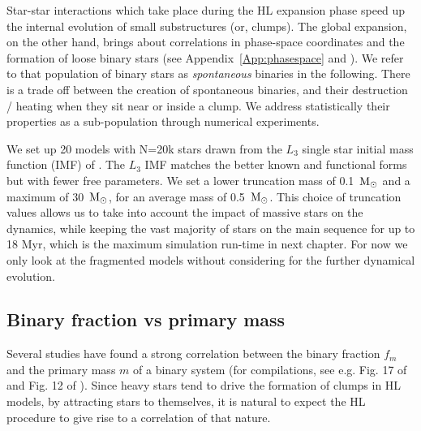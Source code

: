 Star-star interactions which take place during the HL expansion phase speed up the internal evolution of small substructures (or, clumps). The global expansion, on the other hand, brings about correlations in phase-space coordinates and the formation of loose binary stars (see Appendix~\ref{App:phasespace} and \citealt{Kouwenhoven2010,Moeckel2011}). We refer to that population of binary stars as {\it spontaneous} binaries in the following. There is a trade off between the creation of spontaneous binaries, and their destruction / heating when they sit near or inside a clump. We address statistically their properties as a sub-population through numerical experiments.

We set up 20 models with N=20k stars drawn from the $L_3$ single star initial mass function (IMF) of \cite{Maschberger2013}. The $L_3$ IMF  matches the better known \cite{Kroupa2001a} and \cite{Chabrier2003} functional forms but with fewer free parameters. We set a lower truncation mass of 0.1~${\textrm{M}_\odot}$ and a maximum of 30~${\textrm{M}_\odot}$, for an average mass of 0.5~${\textrm{M}_\odot}$. This choice of truncation values allows us to take into account the impact of massive stars on the dynamics, while keeping the vast majority of stars on the main sequence for up to 18 Myr, which is the maximum simulation run-time in next chapter. For now we only look at the fragmented models without considering for the further dynamical evolution.


\subsection{Binary fraction vs primary mass}
\label{Sub:spontaneous_binaryfractions}

Several studies have found a strong correlation between the binary fraction $f_m$ and the primary mass $m$ of a binary system (for compilations, see e.g. Fig. 17 of \citealt{Bate2012} and Fig. 12 of \citealt{Raghavan2010}). Since heavy stars tend to drive the formation of clumps in HL models, by attracting stars to themselves, it is natural to expect the HL procedure to give rise to a correlation of that nature.  



